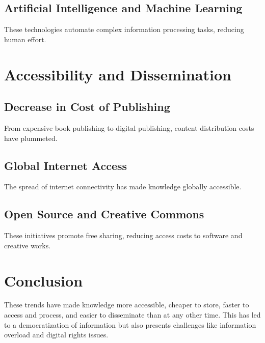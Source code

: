 \documentclass[12pt,titlepage]{book}
\begin{document}
\subsection{Artificial Intelligence and Machine Learning}
These technologies automate complex information processing tasks, reducing human effort.

\section{Accessibility and Dissemination}

\subsection{Decrease in Cost of Publishing}
From expensive book publishing to digital publishing, content distribution costs have plummeted.

\subsection{Global Internet Access}
The spread of internet connectivity has made knowledge globally accessible.

\subsection{Open Source and Creative Commons}
These initiatives promote free sharing, reducing access costs to software and creative works.

\section{Conclusion}

These trends have made knowledge more accessible, cheaper to store, faster to access and process, and easier to disseminate than at any other time. This has led to a democratization of information but also presents challenges like information overload and digital rights issues.


\listoftables

{}



\renewcommand{\indexname}{Index of Defined Terms}
{\twocolumn[]
{\small\printindex}}


\end{document}
